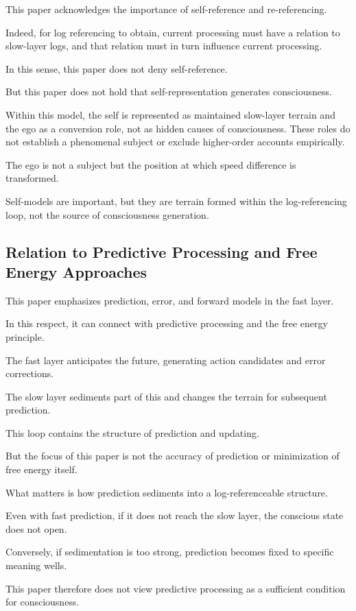 This paper acknowledges the importance of self-reference and re-referencing.

Indeed, for log referencing to obtain, current processing must have a relation to slow-layer logs, and that relation must in turn influence current processing.

In this sense, this paper does not deny self-reference.

But this paper does not hold that self-representation generates consciousness.

Within this model, the self is represented as maintained slow-layer terrain and the ego as a conversion role, not as hidden causes of consciousness. These roles do not establish a phenomenal subject or exclude higher-order accounts empirically.

The ego is not a subject but the position at which speed difference is transformed.

Self-models are important, but they are terrain formed within the log-referencing loop, not the source of consciousness generation.

\subsection{Relation to Predictive Processing and Free Energy Approaches}


This paper emphasizes prediction, error, and forward models in the fast layer.

In this respect, it can connect with predictive processing and the free energy principle.

The fast layer anticipates the future, generating action candidates and error corrections.

The slow layer sediments part of this and changes the terrain for subsequent prediction.

This loop contains the structure of prediction and updating.

But the focus of this paper is not the accuracy of prediction or minimization of free energy itself.

What matters is how prediction sediments into a log-referenceable structure.

Even with fast prediction, if it does not reach the slow layer, the conscious state does not open.

Conversely, if sedimentation is too strong, prediction becomes fixed to specific meaning wells.

This paper therefore does not view predictive processing as a sufficient condition for consciousness.

